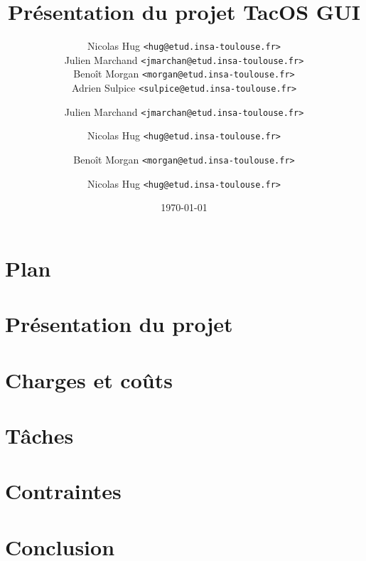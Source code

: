 \documentclass[xcolor=table,12pt]{beamer}
\title{Présentation du projet TacOS GUI}
\author[TacOS GUI Team (hug, jmarchan, morgan, sulpice)]{Nicolas Hug \texttt{<hug@etud.insa-toulouse.fr>}\\
Julien Marchand \texttt{<jmarchan@etud.insa-toulouse.fr>}\\
Benoît Morgan \texttt{<morgan@etud.insa-toulouse.fr>}\\
Adrien Sulpice \texttt{<sulpice@etud.insa-toulouse.fr>}}
\institute{INSA de Toulouse}
\date{\today}
\begin{document}

\frame{\titlepage}

\section[Plan]{Plan}
\frame{\tableofcontents}

\section{Présentation du projet}

\author{Julien Marchand \texttt{<jmarchan@etud.insa-toulouse.fr>}}
\section{Charges et coûts}

\author{Nicolas Hug \texttt{<hug@etud.insa-toulouse.fr>}}
\section{Tâches}

\author{Benoît Morgan \texttt{<morgan@etud.insa-toulouse.fr>}}
\section{Contraintes}

\section{Conclusion}
\author{Nicolas Hug \texttt{<hug@etud.insa-toulouse.fr>}}

\end{document}
